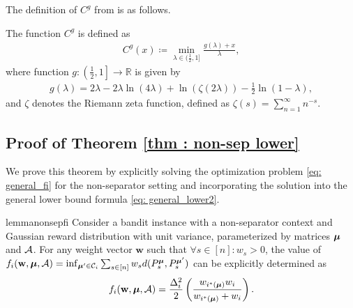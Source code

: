 The definition of $C^g$ from \cite{kaufmann2021mixture} is as follows.

\begin{definition}\label{def: c-g function}
   The function $C^g$ is defined as
    \begin{align*}
            C^g(x) \coloneqq \min_{\lambda \in (\frac12, 1]} \frac{g(\lambda) + x}{\lambda},
    \end{align*}
          where function $g: \left(\frac{1}{2}, 1\right] \rightarrow \mathbb{R}$ is given by
    \begin{align*}
            g(\lambda) = 2\lambda - 2\lambda\ln(4\lambda) + \ln(\zeta(2\lambda)) - \frac12 \ln(1 - \lambda),          
    \end{align*}
    and $\zeta$ denotes the Riemann zeta function, defined as $\zeta(s) = \sum_{n=1}^{\infty} n^{-s}$.
\end{definition}



\subsection{Proof of Theorem \ref{thm : non-sep lower}}
We prove this theorem by explicitly solving the optimization problem \eqref{eq: general_fi} for the non-separator setting and incorporating the solution into the general lower bound formula \eqref{eq: general_lower2}.
\begin{restatable}{lemma}{nonsepfi} \label{lem : non-sep fi} 
            Consider a bandit instance with a non-separator context and Gaussian reward distribution with unit variance, parameterized by matrices $\boldsymbol{\mu}$ and $\mathcal{A}$. For any weight vector $\mathbf{w}$ such that $\forall s \in [n]: w_s > 0$, the value of $f_i(\mathbf{w}, \boldsymbol{\mu}, \mathcal{A}) = \inf_{\boldsymbol{\mu}' \in \mathcal{C}_i} \sum_{s \in [n]} w_s d(P^{\boldsymbol{\mu}}_{s}, P^{\boldsymbol{\mu}'}_{s})$ can be explicitly determined as
            \begin{align*}
                f_i(\mathbf{w}, \boldsymbol{\mu}, \mathcal{A}) = \frac{\Delta_{i}^2}{2}\left( \frac{w_{i^*(\boldsymbol{\mu})}w_i}{w_{i^*(\boldsymbol{\mu})} + w_i}\right).  
            \end{align*}
\end{restatable}

